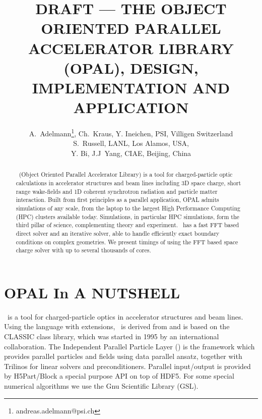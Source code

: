\documentclass[acus]{JAC2003}
\begin{document}
\title{DRAFT --- THE OBJECT ORIENTED PARALLEL ACCELERATOR LIBRARY (OPAL), DESIGN, IMPLEMENTATION AND APPLICATION}

\author{A.~Adelmann\thanks{andreas.adelmann@psi.ch}, Ch.~Kraus, Y. Ineichen, PSI, Villigen Switzerland \\
S.~Russell, LANL, Los Alamos, USA,\\ Y. Bi, J.J~Yang, CIAE, Beijing, China}

\maketitle

\begin{abstract}
   \opal\  (Object Oriented Parallel Accelerator Library) is a tool for charged-particle optic calculations in accelerator structures and beam lines including 3D space charge, 
short range wake-fields and 1D coherent synchrotron radiation and particle matter interaction. Built from first principles as a parallel application, OPAL admits simulations of any scale, 
from the laptop to the largest High Performance Computing (HPC) clusters available today. Simulations, in particular HPC simulations, form the third pillar of science, 
complementing theory and experiment. \opal\ has a fast FFT based direct solver and an iterative solver, able to handle efficiently exact boundary conditions on complex geometries. 
We present timings of \opalt using the FFT based space charge solver with up to several thousands of cores. 
\end{abstract}

\section{OPAL In A NUTSHELL}
\opal\ is a tool for charged-particle optics in
accelerator structures and beam lines. 
Using the \mad language with extensions, \opal\ is derived from \madninep and is based 
on the CLASSIC class library,
which was started in 1995 by an international collaboration.  The Independent Parallel Particle Layer (\ippl) is
the framework which provides parallel particles and fields using data parallel ansatz, together with Trilinos for linear solvers and preconditioners. Parallel input/output is
provided by H5Part/Block a special purpose API on top of HDF5. For some special numerical algorithms we use the Gnu Scientific Library (GSL).
\end{document}
